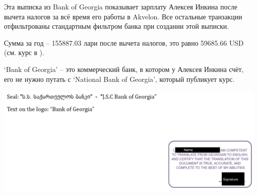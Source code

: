 
Эта выписка из Bank of Georgia показывает зарплату Алексея Инкина после вычета налогов за всё время его работы в Akvelon.
Все остальные транзакции отфильтрованы стандартным фильтром банка при создании этой выписки.

Сумма за год -- 155887.03 лари после вычета налогов,
это равно 59685.66 USD (см. курс в ).

`Bank of Georgia' -- это коммерческий банк, в котором у Алексея Инкина счёт,
его не нужно путать с `National Bank of Georgia', который публикует курс.



\includegraphics[width=\textwidth]{bank-statement_tr_public}

\pagebreak
